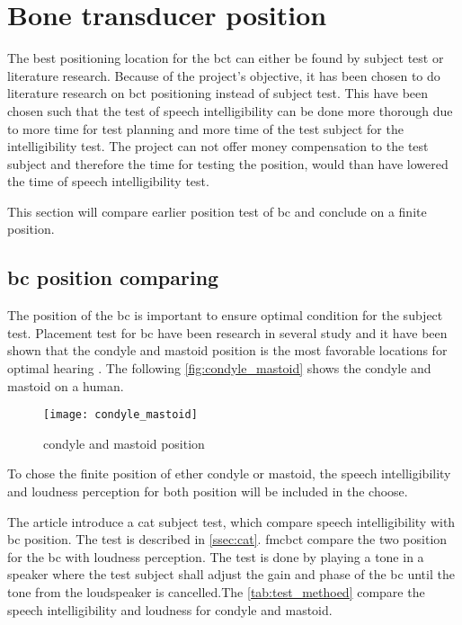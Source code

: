 \section{Bone transducer position}
\label{sec:bc_pos}

The best positioning location for the \gls{bct} can either be found by subject test or literature research. Because of the project's objective, it has been chosen to do literature research on \gls{bct} positioning instead of subject test. This have been chosen such that the test of speech intelligibility can be done more thorough due to more time for test planning and more time of the test subject for the intelligibility test. The project can not offer money compensation to the test subject and therefore the time for testing the position, would than have lowered the time of speech intelligibility test. 

This section will compare earlier position test of \gls{bc} and conclude on a finite position.

\subsection{\gls{bc} position comparing}
The position of the \gls{bc} is important to ensure optimal condition for the subject test. Placement test for \gls{bc} have been research in several study and it have been shown that the condyle and mastoid position is the most favorable locations for optimal hearing \citep{cat_test}. The following \autoref{fig:condyle_mastoid} shows the  condyle and mastoid on a human.

\begin{figure}[H]
	\centering
		\texttt{[image: condyle\_mastoid]}
		\caption{condyle and mastoid position \citep{cat_test}}
		\label{fig:condyle_mastoid}
\end{figure}

To chose the finite position of ether condyle or mastoid, the speech intelligibility and loudness perception for both position will be included in the choose. 


The article \citep{cat_test} introduce a \gls{cat} subject test, which compare  speech intelligibility with \gls{bc} position. The test is described in \autoref{ssec:cat}. \gls{fmcbct} \citep{freefield_method} compare the two position for the \gls{bc} with loudness perception. The test is done by playing a tone in a speaker where the test subject shall adjust the gain and phase of the \gls{bc} until the tone from the loudspeaker is cancelled.The \autoref{tab:test_methoed} compare the speech intelligibility and loudness for condyle and mastoid.


